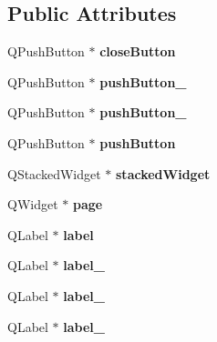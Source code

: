 \subsection*{Public Attributes}
\begin{DoxyCompactItemize}
\item 
\hypertarget{classUi__about_a7c764d7b424b82cda32db2aa1067fba4}{
QPushButton $\ast$ {\bfseries closeButton}}
\label{classUi__about_a7c764d7b424b82cda32db2aa1067fba4}

\item 
\hypertarget{classUi__about_abeef62c6750cebb3c0f0912ae74409a5}{
QPushButton $\ast$ {\bfseries pushButton\_}}
\label{classUi__about_abeef62c6750cebb3c0f0912ae74409a5}

\item 
\hypertarget{classUi__about_a9dedeaa7b70ac20bcd4912ddcdf0ec64}{
QPushButton $\ast$ {\bfseries pushButton\_}}
\label{classUi__about_a9dedeaa7b70ac20bcd4912ddcdf0ec64}

\item 
\hypertarget{classUi__about_a8880d015410b512f4e5768d161b24fb9}{
QPushButton $\ast$ {\bfseries pushButton}}
\label{classUi__about_a8880d015410b512f4e5768d161b24fb9}

\item 
\hypertarget{classUi__about_ae47ab43139893b6e08dba3cb781dcd4f}{
QStackedWidget $\ast$ {\bfseries stackedWidget}}
\label{classUi__about_ae47ab43139893b6e08dba3cb781dcd4f}

\item 
\hypertarget{classUi__about_acdbd820c02029d71cfc119a9832fef24}{
QWidget $\ast$ {\bfseries page}}
\label{classUi__about_acdbd820c02029d71cfc119a9832fef24}

\item 
\hypertarget{classUi__about_a30c2d2ae8206508b81d75f45349bd8fc}{
QLabel $\ast$ {\bfseries label}}
\label{classUi__about_a30c2d2ae8206508b81d75f45349bd8fc}

\item 
\hypertarget{classUi__about_ae19cfd158b2f8da605548ed66ca3e370}{
QLabel $\ast$ {\bfseries label\_}}
\label{classUi__about_ae19cfd158b2f8da605548ed66ca3e370}

\item 
\hypertarget{classUi__about_aaea79e09f696d357043c9bb49f8ca467}{
QLabel $\ast$ {\bfseries label\_}}
\label{classUi__about_aaea79e09f696d357043c9bb49f8ca467}

\item 
\hypertarget{classUi__about_a8387738d5bdde604124f3f117f367e74}{
QLabel $\ast$ {\bfseries label\_}}
\label{classUi__about_a8387738d5bdde604124f3f117f367e74}


\end{DoxyCompactItemize}
